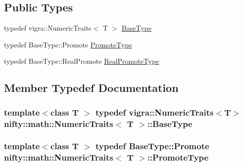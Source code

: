 \subsection*{Public Types}
\begin{DoxyCompactItemize}
\item 
typedef vigra\+::\+Numeric\+Traits$<$ T $>$ \hyperlink{structnifty_1_1math_1_1NumericTraits_abccb0907651fb8a346015c6aad17077e}{Base\+Type}
\item 
typedef Base\+Type\+::\+Promote \hyperlink{structnifty_1_1math_1_1NumericTraits_a001a907b6cbeaaf29fb52ff31261e811}{Promote\+Type}
\item 
typedef Base\+Type\+::\+Real\+Promote \hyperlink{structnifty_1_1math_1_1NumericTraits_a5030d5141aa16424cd49d272306cd716}{Real\+Promote\+Type}
\end{DoxyCompactItemize}


\subsection{Member Typedef Documentation}
\hypertarget{structnifty_1_1math_1_1NumericTraits_abccb0907651fb8a346015c6aad17077e}{}
\subsubsection[{Base\+Type}]{\setlength{\rightskip}{0pt plus 5cm}template$<$class T $>$ typedef vigra\+::\+Numeric\+Traits$<$T$>$ {\bf nifty\+::math\+::\+Numeric\+Traits}$<$ T $>$\+::{\bf Base\+Type}}\label{structnifty_1_1math_1_1NumericTraits_abccb0907651fb8a346015c6aad17077e}
\hypertarget{structnifty_1_1math_1_1NumericTraits_a001a907b6cbeaaf29fb52ff31261e811}{}
\subsubsection[{Promote\+Type}]{\setlength{\rightskip}{0pt plus 5cm}template$<$class T $>$ typedef Base\+Type\+::\+Promote {\bf nifty\+::math\+::\+Numeric\+Traits}$<$ T $>$\+::{\bf Promote\+Type}}\label{structnifty_1_1math_1_1NumericTraits_a001a907b6cbeaaf29fb52ff31261e811}
\hypertarget{structnifty_1_1math_1_1NumericTraits_a5030d5141aa16424cd49d272306cd716}{}
